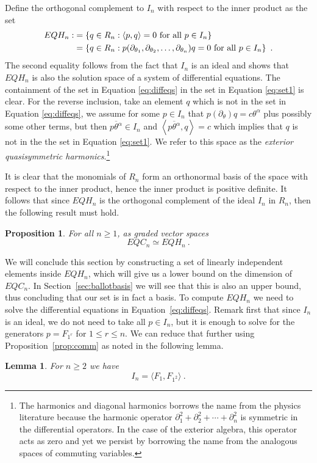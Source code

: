 \documentclass[11pt]{amsart}
\newtheorem{prop}[theorem]{Proposition}
\newtheorem{lemma}[theorem]{Lemma}
\theoremstyle{definition}
\numberwithin{equation}{section}
\newcommand{\mike}[1]{\todo[size=\tiny,color=lime!30]{#1 \\ \hfill --- Mike}}
\begin{document}
Define the orthogonal complement to $I_n$ with respect to the inner product as
the set
\begin{align}
EQH_n :&= \left\{ q \in R_n : \left< p, q \right> = 0 \hbox{ for all } p \in I_n \right\}
\label{eq:set1}\\
  &=\left\{ q \in R_n : p(\partial_{\theta_1}, \partial_{\theta_2}, \ldots, \partial_{\theta_n})
q= 0 \hbox{ for all } p \in I_n \right\}~.\label{eq:diffeqs}
\end{align}
The second equality follows from the fact that $I_n$ is an ideal
and shows that $EQH_n$ is also the solution space of
a system of differential equations.  The containment of the set
in Equation \eqref{eq:diffeqs} in the set in Equation \eqref{eq:set1} is clear.
For the reverse inclusion, take an element $q$ which is not in the
set in Equation \eqref{eq:diffeqs}, we assume
for some $p \in I_n$ that $p(\partial_\theta) q = c \theta^\alpha$ plus possibly some other terms,
but then $\overline{p \theta^\alpha} \in I_n$
and $\left< \overline{p \theta^\alpha}, q \right> = c$ which implies that $q$ is not in the
the set in Equation \eqref{eq:set1}.
We refer to this space as the \emph{exterior quasisymmetric harmonics}.\footnote{
The harmonics and diagonal harmonics borrows the name from the physics literature
because the harmonic operator $\partial_1^2 + \partial_2^2 + \cdots + \partial_n^2$
is symmetric in the differential operators.  In the case of the exterior algebra,
this operator acts as zero and yet we persist by borrowing the name from the
analogous spaces of commuting variables.
}

It is clear that the monomials of $R_n$ form an orthonormal basis of the space
with respect to the inner product, hence the inner product is positive definite.
It follows that since $EQH_n$ is the orthogonal complement of the ideal $I_n$ in $R_n$,
then the following result must hold.
\begin{prop} For all $n \geq 1$, as graded vector spaces
\[
EQC_n \simeq EQH_n~.
\]
\end{prop}

We will conclude this section  by constructing a set of linearly independent elements inside $EQH_n$, which will
give us a lower  bound on the dimension of $EQC_n$. In Section~\ref{sec:ballotbasis} we will see that this is also an upper bound,
thus concluding that our  set is in fact a basis. To compute $EQH_n$ we need to solve the differential equations in Equation~\eqref{eq:diffeqs}.
Remark first  that since $I_n$ is an ideal, we do not need to take all $p\in I_n$, but it is enough to solve for the generators $p=F_{1^r}$ for  $1\le r\le n$.
We can reduce that further using Proposition~\ref{prop:comm} as noted in the following lemma.
\begin{lemma}\label{lem:idealgen}
For $n\ge 2$ we have
\[
I_n=\langle F_1, F_{1^2}  \rangle~.
\]
\end{lemma}
\end{document}
